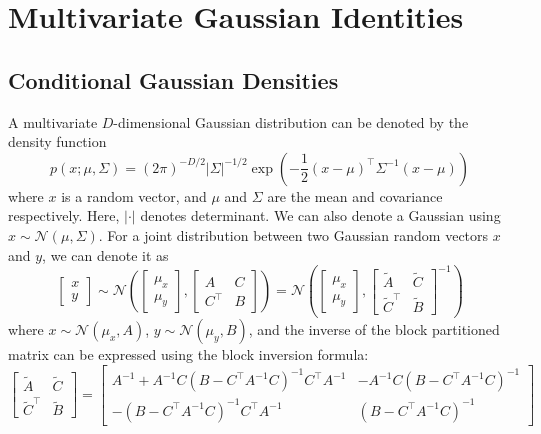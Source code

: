 \documentclass[11pt]{report} %
\begin{document}
\section{Multivariate Gaussian Identities}

\subsection{Conditional Gaussian Densities}

A multivariate $D$-dimensional Gaussian distribution can be denoted by the density function
\begin{equation}
p\left(x;\mu,\Sigma\right)=\left(2\pi\right)^{-D/2}\left|\Sigma\right|^{-1/2}\exp\left(-\dfrac{1}{2}\left(x-\mu\right)^{\top}\Sigma^{-1}\left(x-\mu\right)\right)
\end{equation}
where $x$ is a random vector, and $\mu$ and $\Sigma$ are the mean and covariance respectively. Here, $\left|\cdot\right|$ denotes determinant. We can also denote a Gaussian using $x\sim\mathcal{N}\left(\mu, \Sigma\right)$. For a joint distribution between two Gaussian random vectors $x$ and $y$, we can denote it as
\begin{equation}
\begin{bmatrix}x\\
y
\end{bmatrix}\sim\mathcal{N}\left(\begin{bmatrix}\mu_{x}\\
\mu_{y}
\end{bmatrix},\begin{bmatrix}A & C\\
C^{\top} & B
\end{bmatrix}\right)=\mathcal{N}\left(\begin{bmatrix}\mu_{x}\\
\mu_{y}
\end{bmatrix},\begin{bmatrix}\tilde{A} & \tilde{C}\\
\tilde{C}^{\top} & \tilde{B}
\end{bmatrix}^{-1}\right)
\end{equation}
where $x\sim\mathcal{N}\left(\mu_{x},A\right)$, $y\sim\mathcal{N}\left(\mu_{y},B\right)$, and the inverse of the block partitioned matrix can be expressed using the block inversion formula:
\begin{equation}
\begin{bmatrix}\tilde{A} & \tilde{C}\\
\tilde{C}^{\top} & \tilde{B}
\end{bmatrix}=\begin{bmatrix}A^{-1}+A^{-1}C\left(B-C^{\top}A^{-1}C\right)^{-1}C^{\top}A^{-1} & -A^{-1}C\left(B-C^{\top}A^{-1}C\right)^{-1}\\
-\left(B-C^{\top}A^{-1}C\right)^{-1}C^{\top}A^{-1} & \left(B-C^{\top}A^{-1}C\right)^{-1}
\end{bmatrix}
\end{equation}
\end{document}
